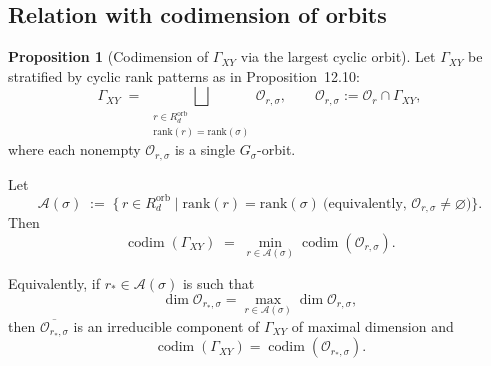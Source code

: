 \documentclass{article}
\newcommand{\codim}{\operatorname{codim}}
\theoremstyle{definition}
\newtheorem{proposition}[theorem]{Proposition}
\begin{document}
\subsection{Relation with codimension of orbits}
\begin{proposition}[Codimension of $\Gamma_{XY}$ via the largest cyclic orbit]
\label{prop:codim-GammaXY-largest-orbit}
Let $\Gamma_{XY}$ be stratified by cyclic rank patterns as in Proposition~12.10:
\[
\Gamma_{XY}
\;=\;
\bigsqcup_{\substack{r\in R^{\mathrm{orb}}_d\\ \mathrm{rank}(r)=\mathrm{rank}(\sigma)}}
\mathcal O_{r,\sigma},
\qquad
\mathcal O_{r,\sigma}:=\mathcal O_r\cap \Gamma_{XY},
\]
where each nonempty $\mathcal O_{r,\sigma}$ is a single $G_\sigma$-orbit.

Let
\[
\mathcal A(\sigma)
\;:=\;
\bigl\{\, r\in R^{\mathrm{orb}}_d \;\big|\;
\mathrm{rank}(r)=\mathrm{rank}(\sigma)
\ \text{(equivalently, } \mathcal O_{r,\sigma}\neq\varnothing ) \bigr\}.
\]
Then
\begin{equation}\label{eq:codim-GammaXY-min}
\codim(\Gamma_{XY})
\;=\;
\min_{r\in \mathcal A(\sigma)}
\codim(\mathcal O_{r,\sigma}).
\end{equation}

Equivalently, if $r_\ast\in \mathcal A(\sigma)$ is such that
\[
\dim \mathcal O_{r_\ast,\sigma}
=
\max_{r\in \mathcal A(\sigma)} \dim \mathcal O_{r,\sigma},
\]
then $\overline{\mathcal O_{r_\ast,\sigma}}$ is an irreducible component of $\Gamma_{XY}$ of maximal dimension and
\begin{equation}\label{eq:codim-GammaXY-largest}
\codim(\Gamma_{XY})
=
\codim(\mathcal O_{r_\ast,\sigma}).
\end{equation}
\end{proposition}
\end{document}
